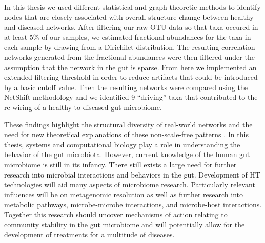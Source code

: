 In this thesis we used different statistical and graph theoretic methods to identify nodes that are closely associated with overall structure change between healthy and diseased networks. After filtering our raw \acrshort{OTU} data so that taxa occured in at least 5\% of our samples, we estimated fractional abundances for the taxa in each sample by drawing from a Dirichilet distribution. The resulting correlation networks generated from the fractional abundances were then filtered under the assumption that the network in the gut is sparse. From here we implemented an extended filtering threshold in order to reduce artifacts that could be introduced by a basic cutoff value. Then the resulting networks were compared using the \acrshort{NetShift} methodology and we identified 9 ``driving'' taxa that contributed to the re-wiring of a healthy to diseased gut microbiome.

These findings highlight the structural diversity of real-world networks and the need for new theoretical explanations of these non-scale-free patterns \citep{Broido2019}. In this thesis, systems and computational biology play a role in understanding the behavior of the gut microbiota. However, current knowledge of the human gut microbiome is still in its infancy. There still exists a large need for further research into microbial interactions and behaviors in the gut. Development of \acrshort{HT} technologies will aid many aspects of microbiome research. Particularly relevant influences will be on metagenomic resolution as well as further research into metabolic pathways, microbe-microbe interactions, and microbe-host interactions. Together this research should uncover mechanisms of action relating to community stability in the gut microbiome and will potentially allow for the development of treatments for a multitude of diseases.

